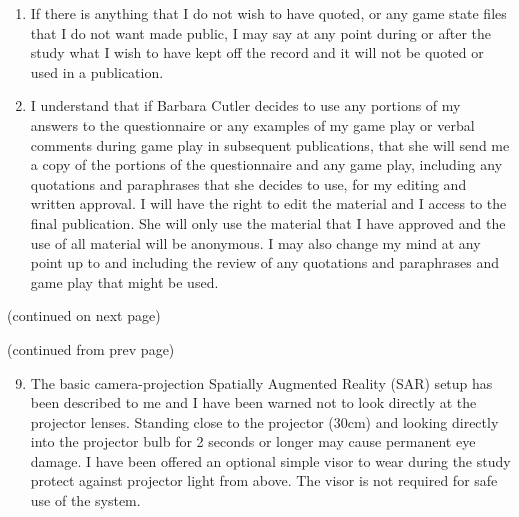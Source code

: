\documentclass[10pt]{article}
\begin{document}
\begin{enumerate}
\item If there is anything that I do not wish to have quoted, or any
  game state files that I do not want made public, I may say at any
  point during or after the study what I wish to have kept off the
  record and it will not be quoted or used in a publication.

\item I understand that if Barbara Cutler decides to use any portions
  of my answers to the questionnaire or any examples of my game play
  or verbal comments during game play in subsequent publications, that
  she will send me a copy of the portions of the questionnaire and any
  game play, including any quotations and paraphrases that she decides
  to use, for my editing and written approval.  I will have the right
  to edit the material and I access to the final publication.  She
  will only use the material that I have approved and the use of all
  material will be anonymous.  I may also change my mind at any point
  up to and including the review of any quotations and paraphrases and
  game play that might be used.

\end{enumerate}

\vspace{0.3in}

\begin{center}(continued on next page)\end{center}

\newpage

\begin{center}(continued from prev page)\end{center}

\vspace{0.3in}

\begin{enumerate}
\setcounter{enumi}{8}

\item The basic camera-projection Spatially Augmented Reality (SAR)
  setup has been described to me and I have been warned not to look
  directly at the projector lenses.  Standing close to the projector
  (30cm) and looking directly into the projector bulb for 2 seconds or
  longer may cause permanent eye damage.  I have been offered an
  optional simple visor to wear during the study protect against
  projector light from above.  The visor is not required for safe use
  of the system.

\end{enumerate}
\end{document}
